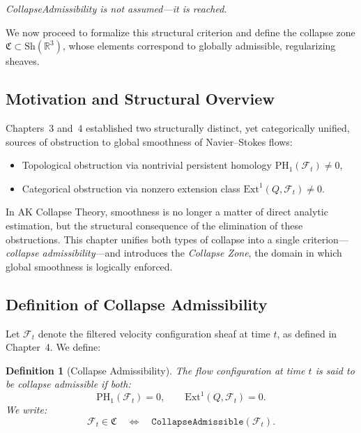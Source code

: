 \documentclass[11pt]{article}
\newtheorem{definition}[theorem]{Definition}
\begin{document}
\begin{center}
\emph{CollapseAdmissibility is not assumed—it is reached.}
\end{center}

We now proceed to formalize this structural criterion and define the collapse zone \( \mathfrak{C} \subset \mathrm{Sh}(\mathbb{R}^3) \), whose elements correspond to globally admissible, regularizing sheaves.

\subsection{Motivation and Structural Overview}

Chapters~3 and~4 established two structurally distinct, yet categorically unified, sources of obstruction to global smoothness of Navier--Stokes flows:
\begin{itemize}
  \item Topological obstruction via nontrivial persistent homology \( \mathrm{PH}_1(\mathcal{F}_t) \neq 0 \),
  \item Categorical obstruction via nonzero extension class \( \mathrm{Ext}^1(Q, \mathcal{F}_t) \neq 0 \).
\end{itemize}

In AK Collapse Theory, smoothness is no longer a matter of direct analytic estimation, but the structural consequence of the elimination of these obstructions. This chapter unifies both types of collapse into a single criterion—\emph{collapse admissibility}—and introduces the \emph{Collapse Zone}, the domain in which global smoothness is logically enforced.

\subsection{Definition of Collapse Admissibility}

Let \( \mathcal{F}_t \) denote the filtered velocity configuration sheaf at time \( t \), as defined in Chapter~4. We define:

\begin{definition}[Collapse Admissibility]
\label{def:collapse-admissible}
The flow configuration at time \( t \) is said to be \emph{collapse admissible} if both:
\begin{equation}
\mathrm{PH}_1(\mathcal{F}_t) = 0, \qquad
\mathrm{Ext}^1(Q, \mathcal{F}_t) = 0.
\end{equation}
We write:
\[
\mathcal{F}_t \in \mathfrak{C} \quad \Longleftrightarrow \quad
\texttt{CollapseAdmissible}(\mathcal{F}_t).
\]
\end{definition}
\end{document}
